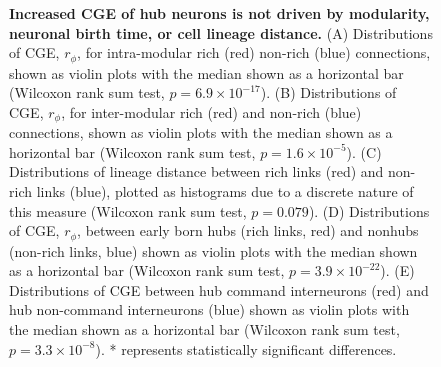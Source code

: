 \documentclass[10pt,letterpaper]{article}
\begin{document}
{%
\begin{figure}[!h]
\centering
 \caption{
 \textbf{Increased CGE of hub neurons is not driven by modularity, neuronal birth time, or cell lineage distance.}
(A) Distributions of CGE, $r_\phi$, for intra-modular rich (red) non-rich (blue) connections, shown as violin plots with the median shown as a horizontal bar (Wilcoxon rank sum test, $p = 6.9 \times 10^{-17}$).
(B) Distributions of CGE, $r_\phi$, for inter-modular rich (red) and non-rich (blue) connections, shown as violin plots with the median shown as a horizontal bar (Wilcoxon rank sum test, $p = 1.6 \times 10^{-5}$).
(C) Distributions of lineage distance between rich links (red) and non-rich links (blue), plotted as histograms due to a discrete nature of this measure (Wilcoxon rank sum test, $p = 0.079$).
(D) Distributions of CGE, $r_\phi$, between early born hubs (rich links, red) and nonhubs (non-rich links, blue) shown as violin plots with the median shown as a horizontal bar (Wilcoxon rank sum test, $p = 3.9 \times 10^{-22}$).
(E) Distributions of CGE between hub command interneurons (red) and hub non-command interneurons (blue) shown as violin plots with the median shown as a horizontal bar (Wilcoxon rank sum test, $p = 3.3 \times 10^{-8}$). * represents statistically significant differences.
}
\end{figure}}
\end{document}
